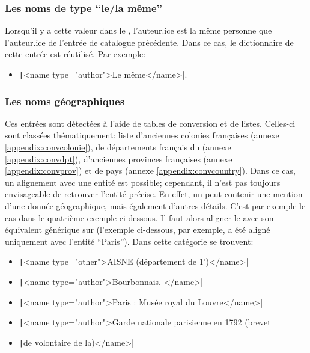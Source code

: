 \subsubsection{Les noms de type \enquote{le/la même}}
Lorsqu'il y a cette valeur dans le \tname{}, l'auteur.ice est la même personne que l'auteur.ice de l'entrée de catalogue précédente. Dans ce cas, le dictionnaire de cette entrée est réutilisé. Par exemple:
\begin{itemize}
	\item \texttt|<name type="author">Le même</name>|.
\end{itemize}

\subsubsection{Les noms géographiques}
Ces entrées sont détectées à l'aide de tables de conversion et de listes. Celles-ci sont classées thématiquement: liste d'anciennes colonies françaises (annexe \ref{appendix:convcolonie}), de départements français du (annexe \ref{appendix:convdpt}), d'anciennes provinces françaises (annexe \ref{appendix:convprov}) et de pays (annexe \ref{appendix:convcountry}). Dans ce cas, un alignement avec une entité \wkd{} est possible; cependant, il n'est pas toujours envisageable de retrouver l'entité précise. En effet, un \tname{} peut contenir une mention d'une donnée géographique, mais également d'autres détails. C'est par exemple le cas dans le quatrième exemple ci-dessous. Il faut alors aligner le \tname{} avec son équivalent générique sur \wkd{} (l'exemple ci-dessous, par exemple, a été aligné uniquement avec l'entité \enquote{Paris}). Dans cette catégorie se trouvent:
\begin{itemize}
	\item \texttt|<name type="other">AISNE (département de 1')</name>|
	\item \texttt|<name type="author">Bourbonnais. </name>|
	\item \texttt|<name type="author">Paris : Musée royal du Louvre</name>|
	\item \texttt|<name type="author">Garde nationale parisienne en 1792 (brevet|
\end{itemize}
\begin{itemize}[label={}]
	\item \texttt|de volontaire de la)</name>|
\end{itemize}

